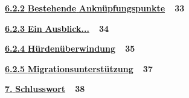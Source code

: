\documentclass[a4paper]{article}
\newcommand\textstyleInternetlink[1]{\foreignlanguage{english}{\textcolor[rgb]{0.0,0.0,0.5019608}{#1}}}
\begin{document}
\bigskip

{
\hyperlink{BestehendeAnknpfungspunkte}{\textstyleInternetlink{\foreignlanguage{ngerman}{\textbf{6.2.2}}}}\hyperlink{BestehendeAnknpfungspunkte}{\textstyleInternetlink{\foreignlanguage{ngerman}{\textbf{
}}}}\hyperlink{BestehendeAnknpfungspunkte}{\textstyleInternetlink{\foreignlanguage{ngerman}{\textbf{Bestehende}}}}\hyperlink{BestehendeAnknpfungspunkte}{\textstyleInternetlink{\foreignlanguage{ngerman}{\textbf{
}}}}\hyperlink{BestehendeAnknpfungspunkte}{\textstyleInternetlink{\foreignlanguage{ngerman}{\textbf{Ankn\"upfungspunkte}}}}\textbf{\ \ 33}}


\bigskip

{
\hyperlink{EinAusblick}{\textstyleInternetlink{\foreignlanguage{ngerman}{\textbf{6.2.3}}}}\hyperlink{EinAusblick}{\textstyleInternetlink{\foreignlanguage{ngerman}{\textbf{
}}}}\hyperlink{EinAusblick}{\textstyleInternetlink{\foreignlanguage{ngerman}{\textbf{Ein}}}}\hyperlink{EinAusblick}{\textstyleInternetlink{\foreignlanguage{ngerman}{\textbf{
}}}}\hyperlink{EinAusblick}{\textstyleInternetlink{\foreignlanguage{ngerman}{\textbf{Ausblick...}}}}\textbf{\ \ 34}}

{
\hyperlink{Hrdenberwindung}{\textstyleInternetlink{\foreignlanguage{ngerman}{\textbf{6.2.4}}}}\hyperlink{Hrdenberwindung}{\textstyleInternetlink{\foreignlanguage{ngerman}{\textbf{
}}}}\hyperlink{Hrdenberwindung}{\textstyleInternetlink{\textbf{H\"urden\"uberwindung}}}\textbf{\ \ 35}}


\bigskip

{
\hyperlink{Migrationsuntersttzung}{\textstyleInternetlink{\foreignlanguage{ngerman}{\textbf{6.2.5}}}}\hyperlink{Migrationsuntersttzung}{\textstyleInternetlink{\foreignlanguage{ngerman}{\textbf{
}}}}\hyperlink{Migrationsuntersttzung}{\textstyleInternetlink{\textbf{Migrationsunterst\"utzung}}}\textstyleInternetlink{\textbf{\textcolor{black}{\ \ }}}\textbf{37}}


\bigskip


\bigskip

{
\hyperlink{Schlusswort}{\textstyleInternetlink{\foreignlanguage{ngerman}{\textbf{7}}}}\hyperlink{Schlusswort}{\textstyleInternetlink{\foreignlanguage{ngerman}{\textbf{.}}}}\hyperlink{Schlusswort}{\textstyleInternetlink{\foreignlanguage{ngerman}{\textbf{
}}}}\hyperlink{Schlusswort}{\textstyleInternetlink{\textbf{Schlusswort}}}\textbf{\ \ 38}}


\bigskip
\end{document}
